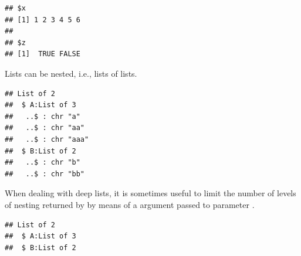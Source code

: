 \documentclass[krantz2]{krantz}\usepackage{knitr}
\begin{document}
\begin{knitrout}\footnotesize
{}\color{fgcolor}\begin{kframe}
\begin{alltt}
\hlopt{$} \hlkwb{<-} 
\end{alltt}
\begin{verbatim}
## $x
## [1] 1 2 3 4 5 6
##
## $z
## [1]  TRUE FALSE
\end{verbatim}
\end{kframe}
\end{knitrout}

Lists can be nested, i.e., lists of lists.

\begin{knitrout}\footnotesize
{}\color{fgcolor}\begin{kframe}
\begin{alltt}
 \hlkwb{<-} \hlstd{(}\hlstd{,} \hlstd{,} \hlstd{)}
 \hlkwb{<-} \hlstd{(}\hlstd{,} \hlstd{)}
 \hlkwb{<-} \hlstd{(}   
\end{alltt}
\begin{verbatim}
## List of 2
##  $ A:List of 3
##   ..$ : chr "a"
##   ..$ : chr "aa"
##   ..$ : chr "aaa"
##  $ B:List of 2
##   ..$ : chr "b"
##   ..$ : chr "bb"
\end{verbatim}
\end{kframe}
\end{knitrout}

\begin{explainbox}
When dealing with deep lists, it is sometimes useful to limit the number of levels of nesting returned by  by means of a  argument passed to parameter .

\begin{knitrout}\footnotesize
{}\color{fgcolor}\begin{kframe}
\begin{alltt}
  \hlstd{=} \hlstd{)}
\end{alltt}
\begin{verbatim}
## List of 2
##  $ A:List of 3
##  $ B:List of 2
\end{verbatim}
\end{kframe}
\end{knitrout}

\end{explainbox}
\end{document}

